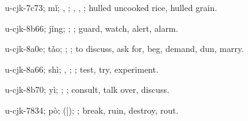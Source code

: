 \begin{multicols}{2}
{\cjkgGlue{}u-cjk-7c73; mǐ; \cjkgGlue{}, \cjkgGlue{}; \cjkgGlue{}, \cjkgGlue{}, \cjkgGlue{}; hulled uncooked rice, hulled grain.

\cjkgGlue{}u-cjk-8b66; jǐng; \cjkgGlue{}\cjkgGlue{}\cjkgGlue{}; \cjkgGlue{}; guard, watch, alert, alarm.

\cjkgGlue{}u-cjk-8a0e; tǎo; \cjkgGlue{}\cjkgGlue{}\cjkgGlue{}; \cjkgGlue{}; to discuss, ask for, beg, demand, dun, marry.

\cjkgGlue{}u-cjk-8a66; shì; \cjkgGlue{}\cjkgGlue{}\cjkgGlue{}, \cjkgGlue{}\cjkgGlue{}\cjkgGlue{}; \cjkgGlue{}; test, try, experiment.

\cjkgGlue{}u-cjk-8b70; yì; \cjkgGlue{}; \cjkgGlue{}; consult, talk over, discuss.

\cjkgGlue{}u-cjk-7834; pò; \cjkgGlue{}\cjkgGlue{}(\cjkgGlue{}|\cjkgGlue{}); \cjkgGlue{}; break, ruin, destroy, rout.

}
\end{multicols}
